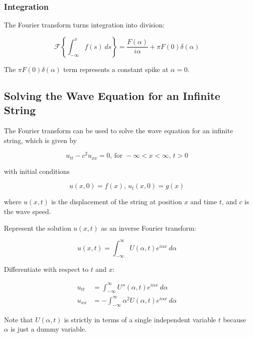 \subsubsection{Integration}

The Fourier transform turns integration into division:

\begin{equation*}
    \mathcal{F}\left\{\int_{-\infty}^x f(s)~ds\right\} = \frac{F(\alpha)}{i\alpha} + \pi F(0)\delta(\alpha)
\end{equation*}

The $\pi F(0)\delta(\alpha)$ term represents a constant spike at $\alpha = 0$.

\subsection{Solving the Wave Equation for an Infinite String}

The Fourier transform can be used to solve the wave equation for an infinite string, which is given by

\begin{equation*}
    u_{tt} - c^2 u_{xx} = 0\text{, for } -\infty < x < \infty\text{, } t > 0
\end{equation*}

with initial conditions

\begin{equation*}
    u(x,0) = f(x)\text{, } u_t(x,0) = g(x)
\end{equation*}

where $u(x,t)$ is the displacement of the string at position $x$ and time $t$, and $c$ is the wave speed.

\vsp

Represent the solution $u(x,t)$ as an inverse Fourier transform:

\begin{equation*}
    u(x,t) = \int_{-\infty}^\infty U(\alpha,t)e^{i\alpha x}~d\alpha
\end{equation*}

Differentiate with respect to $t$ and $x$:

\begin{align*}
    u_{tt} & = \int_{-\infty}^\infty U''(\alpha,t)e^{i\alpha x}~d\alpha         \\
    u_{xx} & = -\int_{-\infty}^\infty \alpha^2 U(\alpha,t)e^{i\alpha x}~d\alpha
\end{align*}

Note that $U(\alpha, t)$ is strictly in terms of a single independent variable $t$ because $\alpha$ is just a dummy variable.


